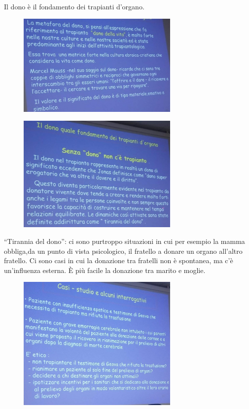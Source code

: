 Il dono è il fondamento dei trapianti d'organo.

\begin{figure}[!ht]
\centering
	\includegraphics[width=0.7\textwidth]{34/image17.jpeg}
	\end{figure}

\begin{figure}[!ht]
\centering
	\includegraphics[width=0.7\textwidth]{34/image18.jpeg}
	\end{figure}

``Tirannia del dono'': ci sono purtroppo situazioni in cui per esempio
la mamma obbliga,da un punto di vista psicologico, il fratello a donare
un organo all'altro fratello. Ci sono casi in cui la donazione tra
fratelli non è spontanea, ma c'è un'influenza esterna. È più facile la
donazione tra marito e moglie.

\begin{figure}[!ht]
\centering
	\includegraphics[width=0.7\textwidth]{34/image19.jpeg}
	\end{figure}

